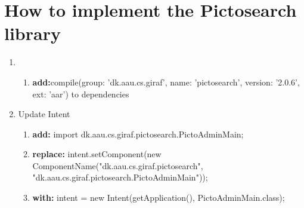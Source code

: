 \chapter{How to implement the Pictosearch library}
\begin{enumerate}
	\item 
	\begin{enumerate}
		\item \textbf{add:}compile(group: 'dk.aau.cs.giraf', name: 'pictosearch', version: '2.0.6', ext: 'aar') to dependencies
	\end{enumerate}
	\item Update Intent
	\begin{enumerate}
		\item \textbf{add:} import dk.aau.cs.giraf.pictosearch.PictoAdminMain;
		\item \textbf{replace:} intent.setComponent(new ComponentName("dk.aau.cs.giraf.pictosearch", "dk.aau.cs.giraf.pictosearch.PictoAdminMain"));
		\item \textbf{with:} intent = new Intent(getApplication(), PictoAdminMain.class);
	\end{enumerate}
\end{enumerate}